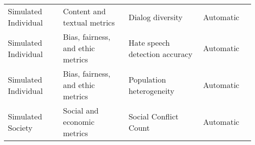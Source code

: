 \begin{small}
\begin{center}
\begin{longtable}{@{}p{}p{}p{}p{}p{}@{}}
Simulated Individual     & Content and textual metrics         & Dialog diversity                                                                                                                                                                                            & Automatic & \cite{lin2024diversedialoguemethodologydesigningchatbots}                                                                                                                                                                                                                                                                                                                                                                                            \\
Simulated Individual     & Bias, fairness, and ethic metrics   & Hate speech detection accuracy                                                                                                                                                                              & Automatic & \cite{giorgi2024humanllmbiaseshate}                                                                                                                                                                                                                                                                                                                                                                                                    \\
Simulated Individual     & Bias, fairness, and ethic metrics   & Population heterogeneity                                                                                                                                                                                    & Automatic & \cite{murthy2024fishfishseaalignment}                                                                                                                                                                                                                                                                                                                                                                                                \\
Simulated Society        & Social and economic metrics         & Social Conflict Count                                                                                                                                                                                       & Automatic & \cite{ren2024emergencesocialnormsgenerative}                                                                                                                                                                                                                                                                                                                                                                                                     \\

\end{longtable}
\end{center}
\end{small}
